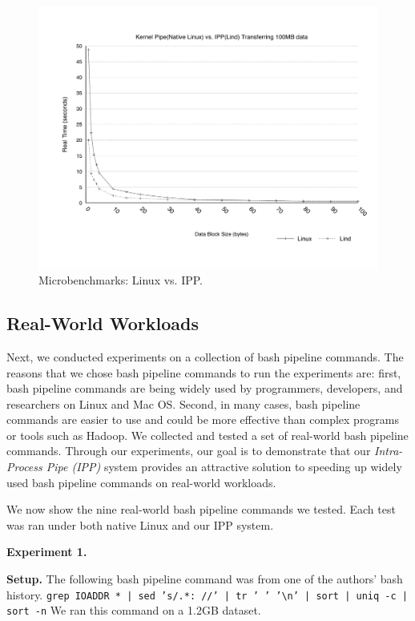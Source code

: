 \begin{figure}
\centering
\includegraphics[width=1.0\columnwidth]{diagram/microbenchmarks.png}
\caption{\small Microbenchmarks: Linux vs. IPP.}
\label{fig:microbenchmarks}
\end{figure}

\subsection{Real-World Workloads}
\label{experiments.real-world_workloads}

Next, we conducted experiments on a collection of bash pipeline commands. 
The reasons that we chose bash pipeline commands to run the experiments are: 
first, bash pipeline commands are being widely used by programmers, developers, and researchers 
on Linux and Mac OS. Second, in many cases, bash pipeline commands are easier to use and could be more effective 
than complex programs or tools such as Hadoop. 
We collected and tested a set of real-world bash pipeline commands. Through our experiments, our goal is to demonstrate that 
our \emph{Intra-Process Pipe (IPP)} system provides an attractive solution to speeding up widely used bash pipeline commands 
on real-world workloads. 

We now show the nine real-world bash pipeline commands we tested. Each test was ran under both native Linux and our IPP system. 

\noindent
\textbf{Experiment 1.}

\noindent
\textbf{Setup.}
The following bash pipeline command was from one of the authors' bash history. 
\texttt{grep IOADDR * | sed 's/.*: //' | tr ' ' '\textbackslash n' | sort | uniq -c | sort -n} 
We ran this command on a 1.2GB dataset. 

